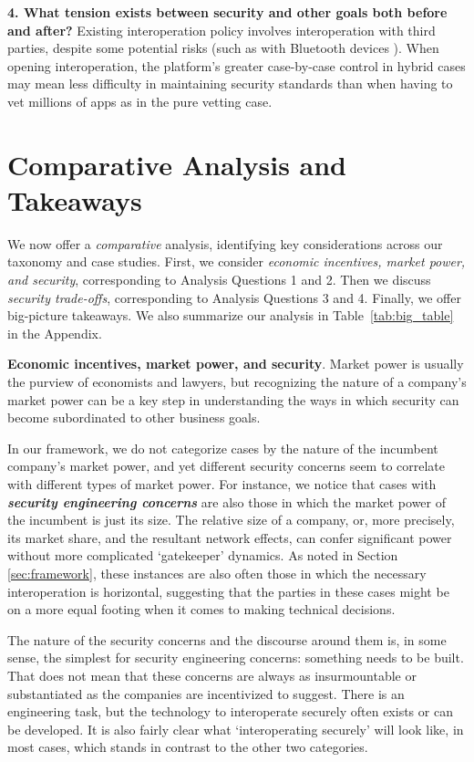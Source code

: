 \documentclass[letterpaper,twocolumn,10pt]{article}
\newcommand{\bi}[1]{\textbf{\textit{#1}}}
\newcommand{\subh}[1]{\smallskip \noindent \textbf{{#1}}.}
\renewcommand{\paragraph}[1]{\subh{#1}}
\newcommand{\qfour}{What tension exists between security and other goals
both before and after?\xspace}
\newcommand{\question}[1]{\smallskip \noindent \textbf{{#1}}}
\begin{document}
\question{4. \qfour} 
Existing interoperation policy involves interoperation with third parties, despite some potential risks (such as with Bluetooth devices \cite{bluetooth_mitm}).
When opening interoperation, the platform's greater case-by-case control in hybrid cases may mean less difficulty in maintaining security standards than when having to vet millions of apps as in the pure vetting case.

\section{Comparative Analysis and Takeaways}
\label{sec:big-picture}

We now offer a \emph{comparative} analysis, identifying key considerations across our taxonomy and case studies. First, we consider \emph{economic incentives, market power, and security}, corresponding to Analysis Questions 1 and 2. Then we discuss \emph{security trade-offs}, corresponding to Analysis Questions 3 and 4. Finally, we offer big-picture takeaways. We also summarize our analysis in Table~\ref{tab:big_table} in the Appendix.

\paragraph{Economic incentives, market power, and security}
Market power is usually the purview of economists and lawyers, but recognizing the nature of a company's market power can be a key step in understanding the ways in which security can become subordinated to other business goals.

In our framework, we do not categorize cases by the nature of the incumbent company's market power, and yet different security concerns seem to correlate with different types of market power. For instance, we notice that cases with \bi{security engineering concerns} are also those in which the market power of the incumbent is just its size. The relative size of a company, or, more precisely, its market share, and the resultant network effects, can confer significant power without more complicated `gatekeeper' dynamics. As noted in Section \ref{sec:framework}, these instances are also often those in which the necessary interoperation is horizontal, suggesting that the parties in these cases might be on a more equal footing when it comes to making technical decisions.  

The nature of the security concerns and the discourse around them is, in some sense, the simplest for security engineering concerns: something needs to be built. That does not mean that these concerns are always as insurmountable or substantiated as the companies are incentivized to suggest. There is an engineering task, but the technology to interoperate securely often exists or can be developed. It is also fairly clear what `interoperating securely' will look like, in most cases, which stands in contrast to the other two categories.
\end{document}
